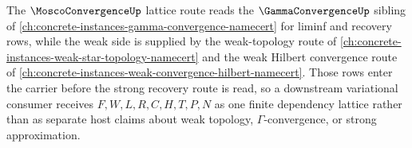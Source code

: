 The $\MoscoConvergenceUp$ lattice route reads the $\GammaConvergenceUp$ sibling of \autoref{ch:concrete-instances-gamma-convergence-namecert} for liminf and recovery rows, while the weak side is supplied by the weak-topology route of \autoref{ch:concrete-instances-weak-star-topology-namecert} and the weak Hilbert convergence route of \autoref{ch:concrete-instances-weak-convergence-hilbert-namecert}. Those rows enter the carrier before the strong recovery route is read, so a downstream variational consumer receives $F,W,L,R,C,H,T,P,N$ as one finite dependency lattice rather than as separate host claims about weak topology, $\Gamma$-convergence, or strong approximation.
